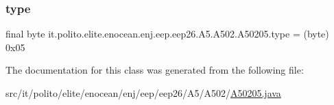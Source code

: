 \subsubsection{\texorpdfstring{type}{type}}
{\footnotesize\ttfamily final byte it.\+polito.\+elite.\+enocean.\+enj.\+eep.\+eep26.\+A5.\+A502.\+A50205.\+type = (byte) 0x05\hspace{0.3cm}{\ttfamily [static]}}



The documentation for this class was generated from the following file\+:\begin{DoxyCompactItemize}
\item 
src/it/polito/elite/enocean/enj/eep/eep26/\+A5/\+A502/\hyperlink{_a50205_8java}{A50205.\+java}\end{DoxyCompactItemize}
